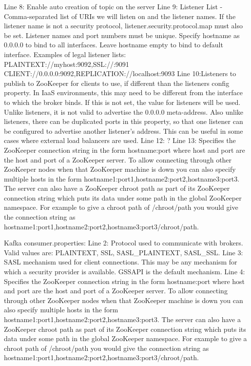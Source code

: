 Line 8: Enable auto creation of topic on the server
Line 9: Listener List - Comma-separated list of URIs we will listen on and the listener names. If the listener name is not a security protocol, listener.security.protocol.map must also be set.
Listener names and port numbers must be unique.
Specify hostname as 0.0.0.0 to bind to all interfaces.
Leave hostname empty to bind to default interface.
Examples of legal listener lists:
PLAINTEXT://myhost:9092,SSL://:9091
CLIENT://0.0.0.0:9092,REPLICATION://localhost:9093
Line 10:Listeners to publish to ZooKeeper for clients to use, if different than the listeners config property. In IaaS environments, this may need to be different from the interface to which the broker binds. If this is not set, the value for listeners will be used. Unlike listeners, it is not valid to advertise the 0.0.0.0 meta-address.
Also unlike listeners, there can be duplicated ports in this property, so that one listener can be configured to advertise another listener's address. This can be useful in some cases where external load balancers are used.
Line 12: ?
Line 13: Specifies the ZooKeeper connection string in the form hostname:port where host and port are the host and port of a ZooKeeper server. To allow connecting through other ZooKeeper nodes when that ZooKeeper machine is down you can also specify multiple hosts in the form hostname1:port1,hostname2:port2,hostname3:port3.
The server can also have a ZooKeeper chroot path as part of its ZooKeeper connection string which puts its data under some path in the global ZooKeeper namespace. For example to give a chroot path of /chroot/path you would give the connection string as hostname1:port1,hostname2:port2,hostname3:port3/chroot/path.

Kafka consumer.properties:
Line 2: Protocol used to communicate with brokers. Valid values are: PLAINTEXT, SSL, SASL\_PLAINTEXT, SASL\_SSL.
Line 3: SASL mechanism used for client connections. This may be any mechanism for which a security provider is available. GSSAPI is the default mechanism.
Line 4: Specifies the ZooKeeper connection string in the form hostname:port where host and port are the host and port of a ZooKeeper server. To allow connecting through other ZooKeeper nodes when that ZooKeeper machine is down you can also specify multiple hosts in the form hostname1:port1,hostname2:port2,hostname3:port3.
The server can also have a ZooKeeper chroot path as part of its ZooKeeper connection string which puts its data under some path in the global ZooKeeper namespace. For example to give a chroot path of /chroot/path you would give the connection string as hostname1:port1,hostname2:port2,hostname3:port3/chroot/path.

